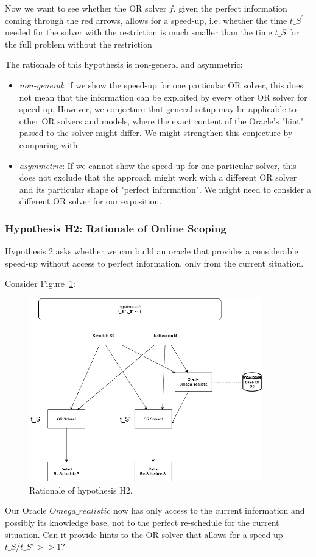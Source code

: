 \documentclass{article}
\begin{document}
Now we want to see whether the OR solver $f$, given the perfect information coming through the red arrows, allows for a speed-up, i.e. whether the time $t\_{S^\prime}$  needed for the solver with the restriction is much smaller than the time $t\_S$ for the full problem without the restriction 

The rationale of this hypothesis is non-general and asymmetric:
%
\begin{itemize}
    \item 
    \emph{non-general}: if we show the speed-up for one particular OR solver, this does not mean that the information can be exploited by every other OR solver for speed-up. However, we conjecture that general setup may be applicable to other OR solvers and models, where the exact content of the Oracle's "hint" passed to the solver might differ. We might strengthen this conjecture by comparing with
\item
    \emph{asymmetric}: If we cannot show the speed-up for one particular solver, this does not exclude that the approach might work with a different OR solver and its particular shape of "perfect information". We might need to consider a different OR solver for our exposition.
\end{itemize}



\subsubsection{Hypothesis H2: Rationale of Online Scoping}\label{subec:H2}
Hypothesis 2 asks whether we can build an oracle that provides a considerable speed-up without access to perfect information, only from the current situation.

Consider Figure~\ref{fig:introduction_H2}:
%
\begin{figure}[hbtp]
	\centering
  \includegraphics[width=0.9\textwidth]{introduction_H2.png}
	\caption{Rationale of hypothesis H2.}
	\label{fig:introduction_H2}
\end{figure}
%
Our Oracle $Omega\_realistic$ now has only access to the current information and possibly its knowledge base, not to the perfect re-schedule for the current situation. Can it provide hints to the OR solver that allows for a speed-up $t\_S / t\_S' >> 1$?
\end{document}
